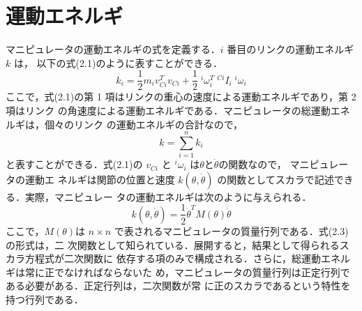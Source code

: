 
 \section{運動エネルギ}

マニピュレータの運動エネルギの式を定義する．$i$ 番目のリンクの運動エネルギ $k$ は，
以下の式(2.1)のように表すことができる．
\begin{equation}
     k_i= \frac{1}{2} m_i v_{Ci}^{T} v_{Ci} +\frac{1}{2} \; {}^{i}{\omega}_{i}^{T} \; {}^{Ci} I_i\; {}^{i}{\omega}_i
\end{equation}
ここで，式(2.1)の第 1 項はリンクの重心の速度による運動エネルギであり，第 2 項はリンク
の角速度による運動エネルギである．マニピュレータの総運動エネルギは，個々のリンク
の運動エネルギの合計なので，
\begin{equation}
     k= \sum^{n}_{i=1}k_{i}
\end{equation}
と表すことができる．式(2.1)の $v_{Ci}$ と ${}^{i}{\omega}_{i}$ は$\theta$と$\dot{\theta}$の関数なので， マニピュレータの運動エ
ネルギは関節の位置と速度 $k(\theta,\dot{\theta})$ の関数としてスカラで記述できる．実際，マニピュレー
タの運動エネルギは次のように与えられる．
\begin{equation}
     k(\theta,\dot{\theta})= \frac{1}{2} \dot{\theta}^T M(\theta) \dot{\theta}
\end{equation}
ここで，$M(\theta)$は $n×n$ で表されるマニピュレータの質量行列である．式(2.3)の形式は，二
次関数として知られている．展開すると，結果として得られるスカラ方程式が二次関数に
依存する項のみで構成される．さらに，総運動エネルギは常に正でなければならないた
め，マニピュレータの質量行列は正定行列である必要がある．正定行列は，二次関数が常
に正のスカラであるという特性を持つ行列である．
\newpage
